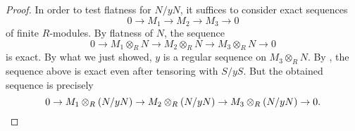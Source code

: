 \documentclass[12pt]{article}
\begin{document}
\begin{proof}
	In order to test flatness for $N/yN$, it suffices to consider exact sequences
	\begin{equation*} 
		0 \to M_{1} \to M_{2} \to M_{3} \to 0
	\end{equation*}
	of finite $R$-modules. By flatness of $N$, the sequence
	\begin{equation*} 
		0 \to M_{1} \otimes_{R} N \to M_{2} \otimes_{R} N \to M_{3} \otimes_{R} N \to 0
	\end{equation*}
	is exact. By what we just showed, $y$ is a regular sequence on $M_{3} \otimes_{R} N$. By , the sequence above is exact even after tensoring with $S/yS$. But the obtained sequence is precisely
	\begin{equation*} 
		0 \to M_{1} \otimes_{R} (N/y N) \to M_{2} \otimes_{R} (N/y N) \to M_{3} \otimes_{R} (N/y N) \to 0. \qedhere
	\end{equation*}
\end{proof}
\end{document}
